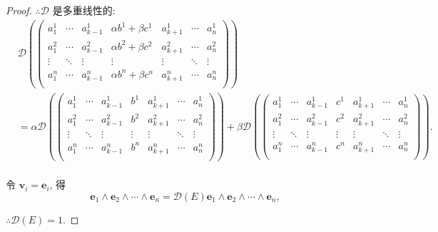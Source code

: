 \documentclass[color=black,device=normal,lang=cn,mode=geye]{elegantnote}
\begin{document}
\begin{proof}
    $\therefore\mathcal{D}$ 是多重线性的:
    \begin{align*}
        & \mathcal{D}\left(\begin{pmatrix}
            a_1^1 & \cdots & a_{k-1}^1 & \alpha b^1+\beta c^1 & a_{k+1}^1 & \cdots & a_n^1 \\
            a_1^2 & \cdots & a_{k-1}^2 & \alpha b^2+\beta c^2 & a_{k+1}^2 & \cdots & a_n^2 \\
            \vdots & \ddots & \vdots & \vdots & \vdots & \ddots & \vdots \\
            a_1^n & \cdots & a_{k-1}^n & \alpha b^n+\beta c^n & a_{k+1}^n & \cdots & a_n^n \\
        \end{pmatrix}\right) \\
        & =\alpha\mathcal{D}\left(\begin{pmatrix}
            a_1^1 & \cdots & a_{k-1}^1 & b^1 & a_{k+1}^1 & \cdots & a_n^1 \\
            a_1^2 & \cdots & a_{k-1}^2 & b^2 & a_{k+1}^2 & \cdots & a_n^2 \\
            \vdots & \ddots & \vdots & \vdots & \vdots & \ddots & \vdots \\
            a_1^n & \cdots & a_{k-1}^n & b^n & a_{k+1}^n & \cdots & a_n^n \\
        \end{pmatrix}\right)+\beta\mathcal{D}\left(\begin{pmatrix}
            a_1^1 & \cdots & a_{k-1}^1 & c^1 & a_{k+1}^1 & \cdots & a_n^1 \\
            a_1^2 & \cdots & a_{k-1}^2 & c^2 & a_{k+1}^2 & \cdots & a_n^2 \\
            \vdots & \ddots & \vdots & \vdots & \vdots & \ddots & \vdots \\
            a_1^n & \cdots & a_{k-1}^n & c^n & a_{k+1}^n & \cdots & a_n^n \\
        \end{pmatrix}\right). \\
    \end{align*}

    令 $\boldsymbol{v}_i=\boldsymbol{e}_i$, 得
    \[\boldsymbol{e}_1\wedge\boldsymbol{e}_2\wedge\cdots\wedge\boldsymbol{e}_n=\mathcal{D}(E)\boldsymbol{e}_1\wedge\boldsymbol{e}_2\wedge\cdots\wedge\boldsymbol{e}_n,\]

    $\therefore\mathcal{D}(E)=1$.
\end{proof}
\end{document}
